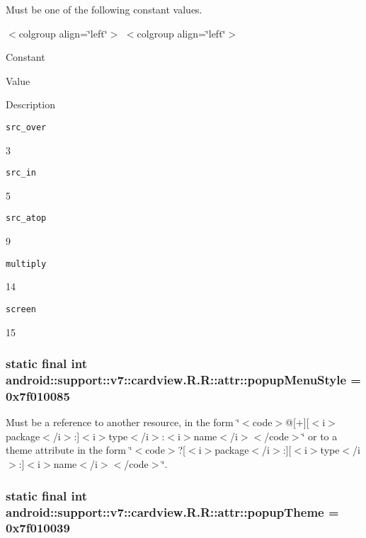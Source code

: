 Must be one of the following constant values. \begin{TabularC}{0}
\hline
\end{TabularC}
$<$colgroup align=\char`\"{}left\char`\"{}$>$ $<$colgroup align=\char`\"{}left\char`\"{}$>$ 

Constant

Value

Description 

{\tt src\_\-over}

3

{\tt src\_\-in}

5

{\tt src\_\-atop}

9

{\tt multiply}

14

{\tt screen}

15\hypertarget{classandroid_1_1support_1_1v7_1_1cardview_1_1_r_1_1attr_c200e583007fb750c0d3028dfb4f3080}{
\subsubsection[{popupMenuStyle}]{\setlength{\rightskip}{0pt plus 5cm}static final int android::support::v7::cardview.R.R::attr::popupMenuStyle = 0x7f010085}}
\label{classandroid_1_1support_1_1v7_1_1cardview_1_1_r_1_1attr_c200e583007fb750c0d3028dfb4f3080}


Must be a reference to another resource, in the form \char`\"{}$<$code$>$@\mbox{[}+\mbox{]}\mbox{[}$<$i$>$package$<$/i$>$:\mbox{]}$<$i$>$type$<$/i$>$:$<$i$>$name$<$/i$>$$<$/code$>$\char`\"{} or to a theme attribute in the form \char`\"{}$<$code$>$?\mbox{[}$<$i$>$package$<$/i$>$:\mbox{]}\mbox{[}$<$i$>$type$<$/i$>$:\mbox{]}$<$i$>$name$<$/i$>$$<$/code$>$\char`\"{}. \hypertarget{classandroid_1_1support_1_1v7_1_1cardview_1_1_r_1_1attr_d5c1fe124508a93d40a8fb0c9c1e6c3b}{
\subsubsection[{popupTheme}]{\setlength{\rightskip}{0pt plus 5cm}static final int android::support::v7::cardview.R.R::attr::popupTheme = 0x7f010039}}
\label{classandroid_1_1support_1_1v7_1_1cardview_1_1_r_1_1attr_d5c1fe124508a93d40a8fb0c9c1e6c3b}


